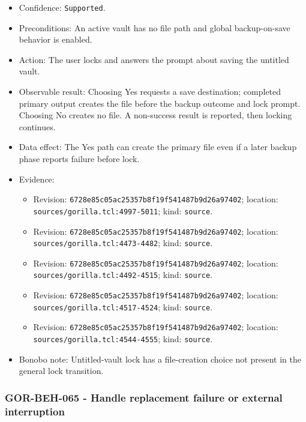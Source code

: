 \documentclass[
  letterpaper,
]{article}
\newcommand{\passthrough}[1]{#1}
\providecommand{\tightlist}{%
  \setlength{\itemsep}{0pt}\setlength{\parskip}{0pt}}
\begin{document}
\begin{itemize}
\tightlist
\item
  Confidence: \passthrough{\lstinline!Supported!}.
\item
  Preconditions: An active vault has no file path and global backup-on-save behavior is enabled.
\item
  Action: The user locks and answers the prompt about saving the untitled vault.
\item
  Observable result: Choosing Yes requests a save destination; completed primary output creates the file before the
  backup outcome and lock prompt. Choosing No creates no file. A non-success result is reported, then locking continues.
\item
  Data effect: The Yes path can create the primary file even if a later backup phase reports failure before lock.
\item
  Evidence:

  \begin{itemize}
  \tightlist
  \item
    Revision: \nolinkurl{6728e85c05ac25357b8f19f541487b9d26a97402}; location: \nolinkurl{sources/gorilla.tcl:4997-5011};
    kind: \passthrough{\lstinline!source!}.
  \item
    Revision: \nolinkurl{6728e85c05ac25357b8f19f541487b9d26a97402}; location: \nolinkurl{sources/gorilla.tcl:4473-4482};
    kind: \passthrough{\lstinline!source!}.
  \item
    Revision: \nolinkurl{6728e85c05ac25357b8f19f541487b9d26a97402}; location: \nolinkurl{sources/gorilla.tcl:4492-4515};
    kind: \passthrough{\lstinline!source!}.
  \item
    Revision: \nolinkurl{6728e85c05ac25357b8f19f541487b9d26a97402}; location: \nolinkurl{sources/gorilla.tcl:4517-4524};
    kind: \passthrough{\lstinline!source!}.
  \item
    Revision: \nolinkurl{6728e85c05ac25357b8f19f541487b9d26a97402}; location: \nolinkurl{sources/gorilla.tcl:4544-4555};
    kind: \passthrough{\lstinline!source!}.
  \end{itemize}
\item
  Bonobo note: Untitled-vault lock has a file-creation choice not present in the general lock transition.
\end{itemize}

\subsubsection{GOR-BEH-065 - Handle replacement failure or external
interruption}\label{gor-beh-065---handle-replacement-failure-or-external-interruption}
\end{document}
